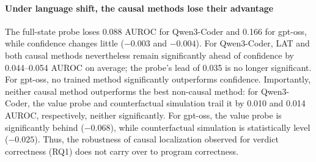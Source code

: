 


\paragraph{Under language shift, the causal methods lose their advantage}
The full-state probe loses 0.088 AUROC for Qwen3-Coder and 0.166 for gpt-oss, while confidence changes little ($-0.003$ and $-0.004$). For Qwen3-Coder, LAT and both causal methods nevertheless remain significantly ahead of confidence by 0.044--0.054 AUROC on average; the probe's lead of 0.035 is no longer significant. For gpt-oss, no trained method significantly outperforms confidence. Importantly, neither causal method outperforms the best non-causal method: for Qwen3-Coder, the value probe and counterfactual simulation trail it by 0.010 and 0.014 AUROC, respectively, neither significantly. For gpt-oss, the value probe is significantly behind ($-0.068$), while counterfactual simulation is statistically level ($-0.025$). Thus, the robustness of causal localization observed for verdict correctness (RQ1) does not carry over to program correctness.




